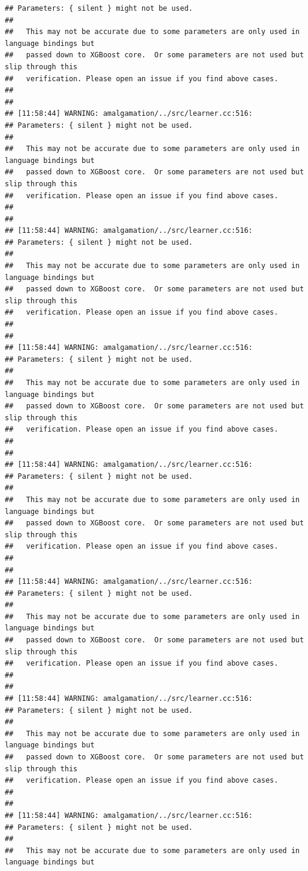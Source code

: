 \documentclass[AMS,STIX2COL]{WileyNJD-v2}\usepackage[]{graphicx}\usepackage[]{color}
\makeatletter
\newenvironment{kframe}{%
 \def\at@end@of@kframe{}%
 \ifinner\ifhmode%
  \def\at@end@of@kframe{\end{minipage}}%
  \begin{minipage}{\columnwidth}%
 \fi\fi%
 \def\FrameCommand##1{\hskip\@totalleftmargin \hskip-\fboxsep
 \colorbox{shadecolor}{##1}\hskip-\fboxsep
     \hskip-\linewidth \hskip-\@totalleftmargin \hskip\columnwidth}%
 \MakeFramed {\advance\hsize-\width
   \@totalleftmargin\z@ \linewidth\hsize
   \@setminipage}}%
 {\par\unskip\endMakeFramed%
 \at@end@of@kframe}
\newenvironment{knitrout}{}{} %
\makeatother
\begin{document}
\begin{knitrout}
\begin{kframe}
\begin{verbatim}
## Parameters: { silent } might not be used.
## 
##   This may not be accurate due to some parameters are only used in language bindings but
##   passed down to XGBoost core.  Or some parameters are not used but slip through this
##   verification. Please open an issue if you find above cases.
## 
## 
## [11:58:44] WARNING: amalgamation/../src/learner.cc:516: 
## Parameters: { silent } might not be used.
## 
##   This may not be accurate due to some parameters are only used in language bindings but
##   passed down to XGBoost core.  Or some parameters are not used but slip through this
##   verification. Please open an issue if you find above cases.
## 
## 
## [11:58:44] WARNING: amalgamation/../src/learner.cc:516: 
## Parameters: { silent } might not be used.
## 
##   This may not be accurate due to some parameters are only used in language bindings but
##   passed down to XGBoost core.  Or some parameters are not used but slip through this
##   verification. Please open an issue if you find above cases.
## 
## 
## [11:58:44] WARNING: amalgamation/../src/learner.cc:516: 
## Parameters: { silent } might not be used.
## 
##   This may not be accurate due to some parameters are only used in language bindings but
##   passed down to XGBoost core.  Or some parameters are not used but slip through this
##   verification. Please open an issue if you find above cases.
## 
## 
## [11:58:44] WARNING: amalgamation/../src/learner.cc:516: 
## Parameters: { silent } might not be used.
## 
##   This may not be accurate due to some parameters are only used in language bindings but
##   passed down to XGBoost core.  Or some parameters are not used but slip through this
##   verification. Please open an issue if you find above cases.
## 
## 
## [11:58:44] WARNING: amalgamation/../src/learner.cc:516: 
## Parameters: { silent } might not be used.
## 
##   This may not be accurate due to some parameters are only used in language bindings but
##   passed down to XGBoost core.  Or some parameters are not used but slip through this
##   verification. Please open an issue if you find above cases.
## 
## 
## [11:58:44] WARNING: amalgamation/../src/learner.cc:516: 
## Parameters: { silent } might not be used.
## 
##   This may not be accurate due to some parameters are only used in language bindings but
##   passed down to XGBoost core.  Or some parameters are not used but slip through this
##   verification. Please open an issue if you find above cases.
## 
## 
## [11:58:44] WARNING: amalgamation/../src/learner.cc:516: 
## Parameters: { silent } might not be used.
## 
##   This may not be accurate due to some parameters are only used in language bindings but

\end{verbatim}
\end{kframe}
\end{knitrout}
\end{document}
